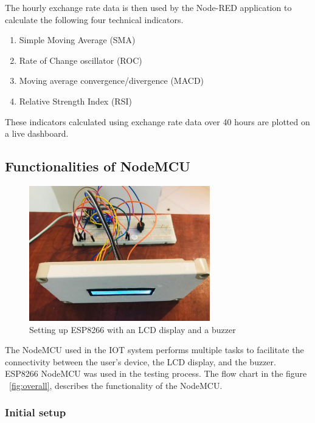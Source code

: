 The hourly exchange rate data is then used by the Node-RED application to calculate the following four technical indicators.\\

\begin{enumerate}[itemsep=-1.7mm]
\item Simple Moving Average (SMA)
\item Rate of Change oscillator (ROC)
\item Moving average convergence/divergence (MACD)
\item Relative Strength Index (RSI)
\end{enumerate}

These indicators calculated using exchange rate data over 40 hours are plotted on a live dashboard. 

\subsection{Functionalities of NodeMCU}

\begin{figure}[h]
    \centering
      \includegraphics[width=0.7\textwidth]{images/front.png}
    \caption{Setting up ESP8266 with an LCD display and a buzzer}
    \label{fig:front}
\end{figure}

The NodeMCU used in the IOT system performs multiple tasks to facilitate the connectivity between the user’s device, the LCD display, and the buzzer. ESP8266 NodeMCU was used in the testing process. The flow chart in the figure ~\ref{fig:overall}, describes the functionality of the NodeMCU.

\subsubsection{Initial setup}


